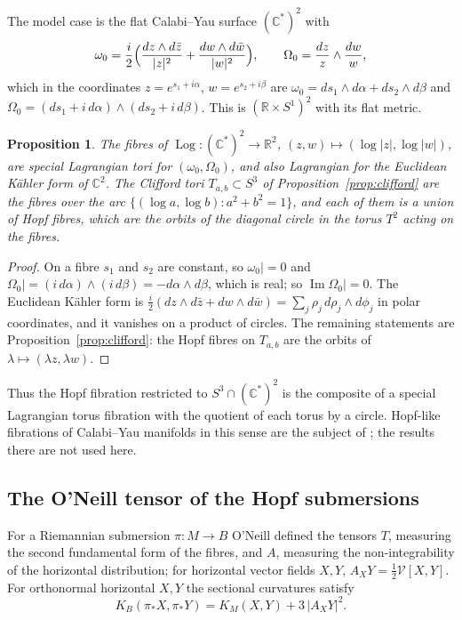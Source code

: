 \documentclass[11pt]{amsart}
\numberwithin{equation}{section}
\theoremstyle{plain}
\newtheorem{proposition}[theorem]{Proposition}
\theoremstyle{definition}
\theoremstyle{remark}
\newcommand{\R}{\mathbb{R}}
\newcommand{\C}{\mathbb{C}}
\newcommand{\Imag}{\operatorname{Im}}
\begin{document}
The model case is the flat Calabi--Yau surface $(\C^*)^2$ with
\[
\omega_0=\frac i2\Bigl(\frac{dz\wedge d\bar z}{|z|^2}+\frac{dw\wedge d\bar w}{|w|^2}\Bigr),\qquad \Omega_0=\frac{dz}{z}\wedge\frac{dw}{w},
\]
which in the coordinates $z=e^{s_1+i\alpha}$, $w=e^{s_2+i\beta}$ are $\omega_0=ds_1\wedge d\alpha+ds_2\wedge d\beta$ and $\Omega_0=(ds_1+i\,d\alpha)\wedge(ds_2+i\,d\beta)$. This is $(\R\times S^1)^2$ with its flat metric.

\begin{proposition}\label{prop:slag}
The fibres of $\operatorname{Log}\colon(\C^*)^2\to\R^2$, $(z,w)\mapsto(\log|z|,\log|w|)$, are special Lagrangian tori for $(\omega_0,\Omega_0)$, and also Lagrangian for the Euclidean K\"ahler form of $\C^2$. The Clifford tori $T_{a,b}\subset S^3$ of Proposition~\ref{prop:clifford} are the fibres over the arc $\{(\log a,\log b):a^2+b^2=1\}$, and each of them is a union of Hopf fibres, which are the orbits of the diagonal circle in the torus $T^2$ acting on the fibres.
\end{proposition}

\begin{proof}
On a fibre $s_1$ and $s_2$ are constant, so $\omega_0|=0$ and $\Omega_0|=(i\,d\alpha)\wedge(i\,d\beta)=-d\alpha\wedge d\beta$, which is real; so $\Imag\Omega_0|=0$. The Euclidean K\"ahler form is $\frac i2(dz\wedge d\bar z+dw\wedge d\bar w)=\sum_j\rho_j\,d\rho_j\wedge d\phi_j$ in polar coordinates, and it vanishes on a product of circles. The remaining statements are Proposition~\ref{prop:clifford}: the Hopf fibres on $T_{a,b}$ are the orbits of $\lambda\mapsto(\lambda z,\lambda w)$.
\end{proof}

Thus the Hopf fibration restricted to $S^3\cap(\C^*)^2$ is the composite of a special Lagrangian torus fibration with the quotient of each torus by a circle. Hopf-like fibrations of Calabi--Yau manifolds in this sense are the subject of \cite{BFS26}; the results there are not used here.

\subsection{The O'Neill tensor of the Hopf submersions}\label{sec:oneill}

For a Riemannian submersion $\pi\colon M\to B$ O'Neill \cite{ONe66} defined the tensors $T$, measuring the second fundamental form of the fibres, and $A$, measuring the non-integrability of the horizontal distribution; for horizontal vector fields $X,Y$, $A_XY=\tfrac12\mathcal V[X,Y]$. For orthonormal horizontal $X,Y$ the sectional curvatures satisfy
\begin{equation}\label{eq:oneill}
K_B(\pi_*X,\pi_*Y)=K_M(X,Y)+3\,|A_XY|^2 .
\end{equation}
\end{document}
